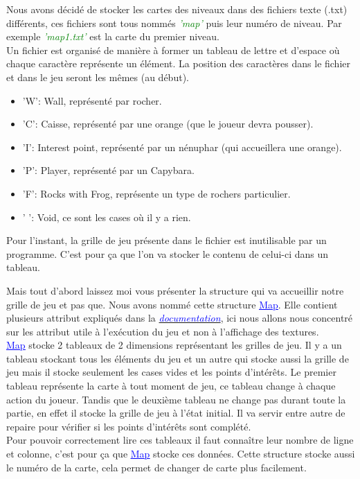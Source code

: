 \documentclass[french, 12pt]{article}
\begin{document}
       Nous avons décidé de stocker les cartes des niveaux dans des fichiers texte (.txt) différents, ces fichiers sont tous nommés \textcolor{green}{\textit{'map'}} puis leur numéro de niveau. Par exemple \textcolor{green}{\textit{'map1.txt'}} est la carte du premier niveau. \\
       Un fichier est organisé de manière à former un tableau de lettre et d'espace où chaque caractère représente un élément. La position des caractères dans le fichier et dans le jeu seront les mêmes (au début).
       \begin{itemize}
           \item 'W': Wall, représenté par rocher.
           \item 'C': Caisse, représenté par une orange (que le joueur devra pousser).
           \item 'I': Interest point, représenté par un nénuphar (qui accueillera une orange).
           \item 'P': Player, représenté par un Capybara.
           \item 'F': Rocks with Frog, représente un type de rochers particulier.
           \item ' ': Void, ce sont les cases où il y a rien.\\
       \end{itemize}


       Pour l'instant, la grille de jeu présente dans le fichier est inutilisable par un programme. C'est pour ça que l'on va stocker le contenu de celui-ci dans un tableau.


       Mais tout d'abord laissez moi vous présenter la structure qui va accueillir notre grille de jeu et pas que. Nous avons nommé cette structure \href{../doc/html/struct_map.html}{\textcolor{blue}{\underline{Map}}}. Elle contient plusieurs attribut expliqués dans la \href{../doc/html/struct_map.html}{\textcolor{blue}{\textit{documentation}}}, ici nous allons nous concentré sur les attribut utile à l'exécution du jeu et non à l'affichage des textures. \\


       \href{../doc/html/struct_map.html}{\textcolor{blue}{\underline{Map}}} stocke 2 tableaux de 2 dimensions représentant les grilles de jeu. Il y a un tableau stockant tous les éléments du jeu et un autre qui stocke aussi la grille de jeu mais il stocke seulement les cases vides et les points d'intérêts. Le premier tableau représente la carte à tout moment de jeu, ce tableau change à chaque action du joueur. Tandis que le deuxième tableau ne change pas durant toute la partie, en effet il stocke la grille de jeu à l'état initial. Il va servir entre autre de repaire pour vérifier si les points d'intérêts sont complété.\\
       Pour pouvoir correctement lire ces tableaux il faut connaître leur nombre de ligne et colonne, c'est pour ça que \href{../doc/html/struct_map.html}{\textcolor{blue}{\underline{Map}}} stocke ces données. Cette structure stocke aussi le numéro de la carte, cela permet de changer de carte plus facilement.
\end{document}
